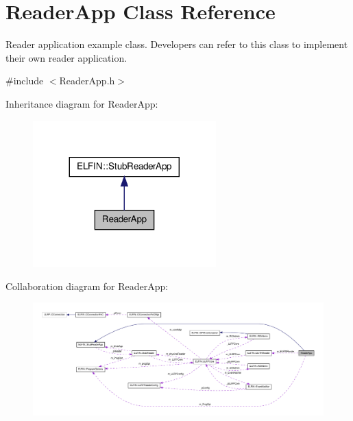 \hypertarget{class_reader_app}{\section{Reader\-App Class Reference}
\label{class_reader_app}
}


Reader application example class. Developers can refer to this class to implement their own reader application.  




{\ttfamily \#include $<$Reader\-App.\-h$>$}



Inheritance diagram for Reader\-App\-:
\nopagebreak
\begin{figure}[H]
\begin{center}
\leavevmode
\includegraphics[width=200pt]{class_reader_app__inherit__graph}
\end{center}
\end{figure}


Collaboration diagram for Reader\-App\-:
\nopagebreak
\begin{figure}[H]
\begin{center}
\leavevmode
\includegraphics[width=350pt]{class_reader_app__coll__graph}
\end{center}
\end{figure}
